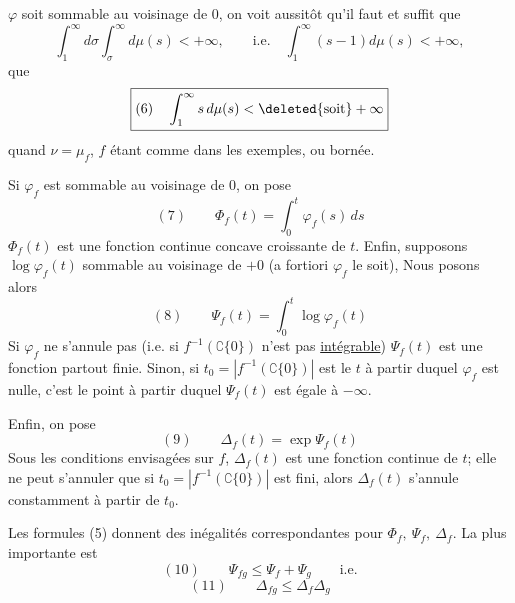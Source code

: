 \(\varphi\) soit sommable au voisinage de \(0\), on voit aussitôt qu'il faut et suffit que
\[
\int_1^\infty d\sigma\int_\sigma^\infty d\mu(s)<+\infty,
\qquad\text{i.e.}\quad\int_1^\infty(s-1)d\mu(s)<+\infty,
\]
 que
\[
\boxed{(6)\quad\int_1^\infty s\,d\mu(s)<\deleted{\text{soit}}+\infty}
\]
 quand \(\nu=\mu_f\), \(f\) étant comme dans les exemples, ou bornée.

Si \(\varphi_f\) est sommable au voisinage de \(0\), on pose
\[
(7)\qquad\Phi_f(t)=\int_0^t\varphi_f(s)\,ds
\]
\(\Phi_f(t)\) est une fonction continue concave croissante de \(t\).
\inserted{Considérons \(\log\varphi_f(t)\), c'est une fonction \deleted{décroissante}\inserted{continue}, à valeurs dans \([-\infty,+\infty[\).}
Enfin, supposons \(\log\varphi_f(t)\) sommable au voisinage de \(+0\) (a fortiori \(\varphi_f\) le soit),\inserted{i.e. \(\log f\) sommable dans \(f^{-1}([1,+\infty[)\)}  Nous posons alors
\[
(8)\qquad\Psi_f(t)=\int_0^t\log\varphi_f(t)
\]
Si \(\varphi_f\) ne s'annule pas  (i.e. si \(f^{-1}(\complement\{0\})\) n'est pas \uline{intégrable}) \(\Psi_f(t)\) est une fonction partout finie. Sinon, si \(t_0=|f^{-1}(\complement\{0\})|\) est le \(t\) à partir duquel \(\varphi_f\) est nulle, c'est le point à partir duquel \(\Psi_f(t)\) est égale à \(-\infty\).

Enfin, on pose
\[
(9)\qquad\Delta_f(t)=\exp\Psi_f(t)
\]
Sous les conditions envisagées sur \(f\), \(\Delta_f(t)\) est une fonction continue  de \(t\); elle ne peut s'annuler que si \(t_0=|f^{-1}(\complement\{0\})|\) est fini, alors \(\Delta_f(t)\) s'annule constamment à partir de \(t_0\).

Les formules (5) donnent des inégalités correspondantes pour \(\Phi_f,\ \Psi_f,\ \Delta_f\). La plus importante est
\[
(10)\qquad\Psi_{fg}\leq\Psi_f+\Psi_g\qquad\text{i.e.}
\]
\[
(11)\qquad\Delta_{fg}\leq\Delta_f\Delta_g
\]

